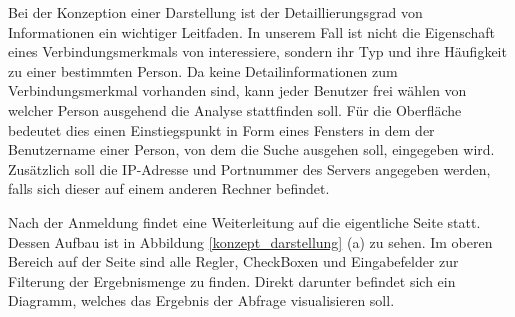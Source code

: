 Bei der Konzeption einer Darstellung ist der Detaillierungsgrad von Informationen ein wichtiger Leitfaden. In unserem Fall ist nicht die Eigenschaft eines Verbindungsmerkmals von interessiere, sondern ihr Typ und ihre Häufigkeit zu einer bestimmten Person. Da keine Detailinformationen zum Verbindungsmerkmal vorhanden sind, kann jeder Benutzer frei wählen von welcher Person ausgehend die Analyse stattfinden soll. Für die Oberfläche bedeutet dies einen Einstiegspunkt in Form eines Fensters in dem der Benutzername einer Person, von dem die Suche ausgehen soll, eingegeben wird. Zusätzlich soll die IP-Adresse und Portnummer des Servers angegeben werden, falls sich dieser auf einem anderen Rechner befindet.

Nach der Anmeldung findet eine Weiterleitung auf die eigentliche Seite statt. Dessen Aufbau ist in Abbildung \ref{konzept_darstellung} (a) zu sehen. Im oberen Bereich auf der Seite sind alle Regler, CheckBoxen und Eingabefelder zur Filterung der Ergebnismenge zu finden. Direkt darunter befindet sich ein Diagramm, welches das Ergebnis der Abfrage visualisieren soll.

